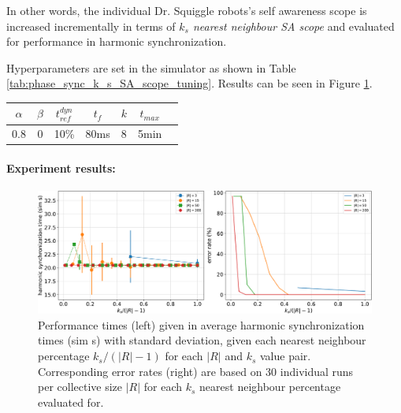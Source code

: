 				In other words, the individual Dr. Squiggle robots's self awareness scope is increased incrementally in terms of \textit{$k_s$ nearest neighbour SA scope} and evaluated for performance in harmonic synchronization.

				Hyperparameters are set in the simulator as shown in Table \ref{tab:phase_sync_k_s_SA_scope_tuning}. Results can be seen in Figure \ref{fig:phase_sync_k_s_SA_scope_tuning}.

				\begin{center}
				\begin{tabular}{ |c|c|c|c|c|c|c| } 
				\hline
				$\alpha$ & $\beta$ & $t_{ref}^{dyn}$ & $t_f$ & $k$ & $t_{max}$ \\
				\hline
				0.8 & 0 & 10\% & 80ms & 8 & 5min \\
				\hline
				\end{tabular}
				\label{tab:phase_sync_k_s_SA_scope_tuning}
				\end{center}
				
				\paragraph{Experiment results:\nl}
				
				\begin{figure}[ht!]
					\centering
					\includegraphics[width=\linewidth]{Assets/DocSegments/Chapters/ExperimentsAndResults/Figures/PerfScores/phase_sync_k_s_SA_scope_tuning_experiment_performance.pdf}
					\caption[Experiment results for $\phi$ synchronization $k_s$ SA scope tuning experiment.]{Performance times (left) given in average harmonic synchronization times (sim s) with standard deviation, given each nearest neighbour percentage $k_s/(|R|-1)$ for each $|R|$ and $k_s$ value pair. Corresponding error rates (right) are based on 30 individual runs per collective size $|R|$ for each $k_s$ nearest neighbour percentage evaluated for.}
					\label{fig:phase_sync_k_s_SA_scope_tuning}
				\end{figure}

